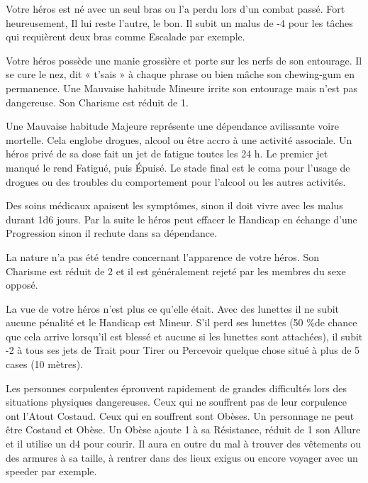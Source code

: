 \begin{description}[align=left]
    \item [Manchot (Majeur)]
        Votre héros est né avec un seul bras ou l'a perdu lors d'un combat passé. Fort heureusement, Il lui reste l'autre, le bon. Il subit un malus de -4 pour les tâches qui requièrent deux bras comme Escalade par exemple.

    \item [Mauvaise habitude (Mineur ou Majeur)]
        Votre héros possède une manie grossière et porte sur les nerfs de son entourage. Il se cure le nez, dit « t'sais » à chaque phrase ou bien mâche son chewing-gum en permanence. Une Mauvaise habitude Mineure irrite son entourage mais n'est pas dangereuse. Son Charisme est réduit de 1.

        Une Mauvaise habitude Majeure représente une dépendance avilissante voire mortelle. Cela englobe drogues, alcool ou être accro à une activité associale. Un héros privé de sa dose fait un jet de fatigue toutes les 24 h. Le premier jet manqué le rend Fatigué, puis Épuisé. Le stade final est le coma pour l'usage de drogues ou des troubles du comportement pour l'alcool ou les autres activités.

        Des soins médicaux apaisent les symptômes, sinon il doit vivre avec les malus durant 1d6 jours. Par la suite le héros peut effacer le Handicap en échange d'une Progression sinon il rechute dans sa dépendance.

    \item [Moche (Mineur)]
        La nature n'a pas été tendre concernant l'apparence de votre héros. Son Charisme est réduit de 2 et il est généralement rejeté par les membres du sexe opposé.

    \item [Myope (Mineur)]
        La vue de votre héros n'est plus ce qu'elle était. Avec des lunettes il ne subit aucune pénalité et le Handicap est Mineur. S'il perd ses lunettes (50 \%de chance que cela arrive lorsqu'il est blessé et aucune si les lunettes sont attachées), il subit -2 à tous ses jets de Trait pour Tirer ou Percevoir quelque chose situé à plus de 5 cases (10 mètres).

    \item [Obèse (Mineur)]
        Les personnes corpulentes éprouvent rapidement de grandes difficultés lors des situations physiques dangereuses. Ceux qui ne souffrent pas de leur corpulence ont l'Atout Costaud. Ceux qui en souffrent sont Obèses. Un personnage ne peut être Costaud et Obèse. Un Obèse ajoute 1 à sa Résistance, réduit de 1 son Allure et il utilise un d4 pour courir. Il aura en outre du mal à trouver des vêtements ou des armures à sa taille, à rentrer dans des lieux exigus ou encore voyager avec un speeder par exemple.


\end{description}
